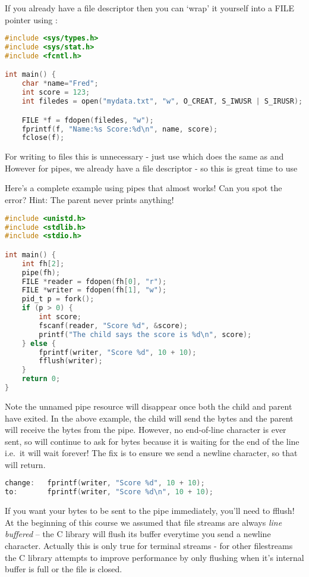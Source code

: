 If you already have a file descriptor then you can `wrap' it yourself into a FILE pointer using  :

\begin{lstlisting}[language=C]
#include <sys/types.h>
#include <sys/stat.h>
#include <fcntl.h>

int main() {
    char *name="Fred";
    int score = 123;
    int filedes = open("mydata.txt", "w", O_CREAT, S_IWUSR | S_IRUSR);

    FILE *f = fdopen(filedes, "w");
    fprintf(f, "Name:%s Score:%d\n", name, score);
    fclose(f);
\end{lstlisting}

For writing to files this is unnecessary - just use  which does the same as  and  However for pipes, we already have a file descriptor - so this is great time to use 

Here's a complete example using pipes that almost works! Can you spot the error? Hint: The parent never prints anything!

\begin{lstlisting}[language=C]
#include <unistd.h>
#include <stdlib.h>
#include <stdio.h>

int main() {
    int fh[2];
    pipe(fh);
    FILE *reader = fdopen(fh[0], "r");
    FILE *writer = fdopen(fh[1], "w");
    pid_t p = fork();
    if (p > 0) {
        int score;
        fscanf(reader, "Score %d", &score);
        printf("The child says the score is %d\n", score);
    } else {
        fprintf(writer, "Score %d", 10 + 10);
        fflush(writer);
    }
    return 0;
}
\end{lstlisting}

Note the unnamed pipe resource will disappear once both the child and parent have exited.
In the above example, the child will send the bytes and the parent will receive the bytes from the pipe.
However, no end-of-line character is ever sent, so  will continue to ask for bytes because it is waiting for the end of the line i.e.~it will wait forever! The fix is to ensure we send a newline character, so that  will return.

\begin{lstlisting}[language=C]
change:   fprintf(writer, "Score %d", 10 + 10);
to:       fprintf(writer, "Score %d\n", 10 + 10);
\end{lstlisting}

If you want your bytes to be sent to the pipe immediately, you'll need to fflush!
At the beginning of this course we assumed that file streams are always \emph{line buffered} -- the C library will flush its buffer everytime you send a newline character.
Actually this is only true for terminal streams - for other filestreams the C library attempts to improve performance by only flushing when it's internal buffer is full or the file is closed.

